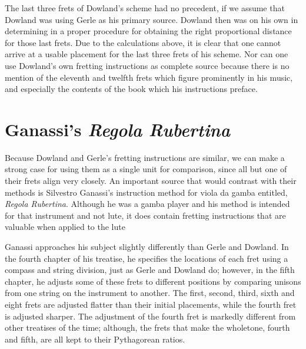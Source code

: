The last three frets of Dowland's scheme had no precedent, if we assume that Dowland
was using Gerle as his primary source.  Dowland then was on his own in determining in a
proper procedure for obtaining the right proportional distance for those last frets.
Due to the calculations above, it is clear that one cannot arrive at a usable
placement for the last three frets of his scheme. Nor can one use Dowland's own
fretting instructions as complete source because there is no mention of the eleventh
and twelfth frets which figure prominently in his music, and especially the contents of
the book which his instructions preface.

\section{Ganassi's \textit{Regola Rubertina}}

Because Dowland and Gerle's fretting instructions are similar, we can
make a strong case for using them as a single unit for comparison, since all but one of
their frets align very closely.  An important source that would contrast with their
methods is Silvestro Ganassi's instruction method for viola da gamba entitled,
\textit{Regola Rubertina}. Although he was a gamba player and his method is intended
for that instrument and not lute, it does contain fretting instructions that are
valuable when applied to the lute

Ganassi approaches his subject slightly differently than Gerle and Dowland.  In the fourth chapter
of his treatise, he specifies the locations of each fret using a compass and string division, just
as Gerle and Dowland do; however, in the fifth chapter, he adjusts some of these frets to different
positions by comparing unisons from one string on the instrument to another.  The first, second,
third, sixth and eight frets are adjusted flatter than their initial placements, while the fourth
fret is adjusted sharper.  The adjustment of the fourth fret is markedly different from other
treatises of the time; although, the frets that make the wholetone, fourth and fifth, are all kept
to their Pythagorean ratios.

